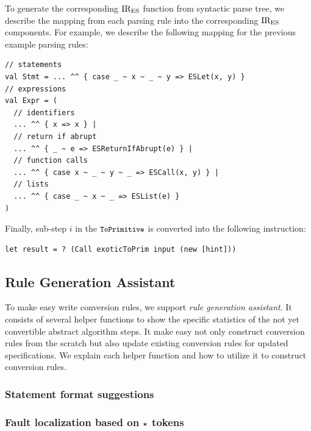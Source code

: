 To generate the corresponding \( \text{IR}_\text{ES} \) function from syntactic parse tree,
we describe the mapping from each parsing rule into the corresponding \( \text{IR}_\text{ES} \) components.
For example, we describe the following mapping for the previous example parsing rules:
\begin{lstlisting}[style=myScalastyle]
// statements
val Stmt = ... ^^ { case _ ~ x ~ _ ~ y => ESLet(x, y) }
// expressions
val Expr = (
  // identifiers
  ... ^^ { x => x } |
  // return if abrupt
  ... ^^ { _ ~ e => ESReturnIfAbrupt(e) } |
  // function calls
  ... ^^ { case x ~ _ ~ y ~ _ => ESCall(x, y) } |
  // lists
  ... ^^ { case _ ~ x ~ _ => ESList(e) }
)
\end{lstlisting}
Finally, sub-step \( i \) in the \( \texttt{\small ToPrimitive} \) is converted
into the following instruction:
\begin{lstlisting}[style=ires]
let result = ? (Call exoticToPrim input (new [hint]))
\end{lstlisting}

\subsection{Rule Generation Assistant}

To make easy write conversion rules, we support \textit{rule generation assistant}.
It consists of several helper functions to show the specific statistics of
the not yet convertible abstract algorithm steps. It make easy not only construct
conversion rules from the scratch but also update existing conversion rules
for updated specifications. We explain each helper function and how to utilize
it to construct conversion rules.

\subsubsection{Statement format suggestions}


\subsubsection{Fault localization based on \( \star \) tokens}

